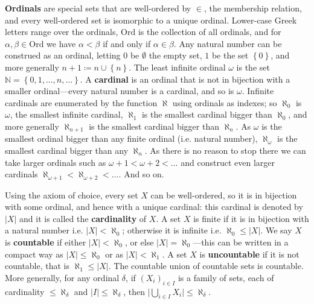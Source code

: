\documentclass[12pt]{amsart}
\newcommand{\N}{\mathbb{N}}	%
\newcommand{\markdef}[1]{\textbf{#1}} %
\newcommand{\setLR}[1]{\left \{ {#1} \right \}} %
\newcommand{\card}[1]{\mathopen | #1 \mathclose |}		%
\newcommand{\On}{\mathord{\mathrm{Ord}}}		%
\theoremstyle{plain}
\theoremstyle{definition}
\theoremstyle{remark}
\begin{document}
\markdef{Ordinals} are special sets that are well-ordered by \( \in \), the membership relation, and every well-ordered set is isomorphic to a unique ordinal.
Lower-case Greek letters range over the ordinals, \( \On \) is the collection of all ordinals, and for \( \alpha , \beta \in \On \) we have \( \alpha < \beta \) if and only if \( \alpha \in \beta \).
Any natural number can be construed as an ordinal, letting \( 0 \) be \( \emptyset \) the empty set, \( 1 \) be the set \( \setLR{0} \), and more generally \( n + 1 \coloneqq n \cup \setLR{ n } \).
The least infinite ordinal \( \omega \) is the set \( \N = \setLR{ 0 , 1 , \dots , n , \dots } \).
A \markdef{cardinal} is an ordinal that is not in bijection with a smaller ordinal---every natural number is a cardinal, and so is \( \omega \).
Infinite cardinals are enumerated by the function \( \aleph \) using ordinals as indexes; so \( \aleph_0 \) is \( \omega \), the smallest infinite cardinal, \( \aleph_1 \) is the smallest cardinal bigger than \( \aleph_0 \), and more generally \( \aleph_{n + 1} \) is the smallest cardinal bigger than \( \aleph_n \).
As \( \omega \) is the smallest ordinal bigger than any finite ordinal (i.e. natural number), \( \aleph_ \omega \) is the smallest cardinal bigger than any \( \aleph_n \).
As there is no reason to stop there we can take larger ordinals such as \( \omega + 1 < \omega + 2 < \dots \) and construct even larger cardinals \( \aleph_{ \omega + 1} < \aleph_{ \omega + 2 } < \dots \).
And so on.

Using the axiom of choice, every set \( X \) can be well-ordered, so it is in bijection with some ordinal, and hence with a unique cardinal: this cardinal is denoted by \( \card{X} \) and it is called the \markdef{cardinality} of \( X \).
A set \( X \) is finite if it is in bijection with a natural number i.e. \( \card{X} < \aleph_0 \); otherwise it is infinite i.e. \( \aleph_0 \leq \card{X} \).
We say \( X \) is \markdef{countable} if either \( \card{X} < \aleph_0 \), or else \( \card{X} = \aleph_0 \)---this can be written in a compact way as \( \card{X} \leq \aleph_0 \) or as \( \card{X} < \aleph_1 \).
A set \( X \) is \markdef{uncountable} if it is not countable, that is \( \aleph_1 \leq \card{X} \).
The countable union of countable sets is countable. 
More generally, for any ordinal \( \delta \), if \( ( X_i )_{ i \in I } \) is a family of sets, each of cardinality \( \leq \aleph_ \delta \) and \( \card{I} \leq \aleph_ \delta \), then \( \card{ \bigcup_{i \in I} X_i } \leq \aleph_ \delta \).
\end{document}
